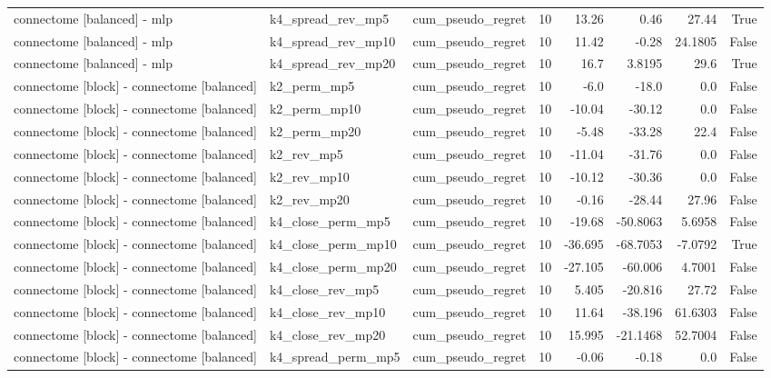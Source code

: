 \begin{table}[t]
\begin{tabular}{lllrrrrr}
connectome [balanced] - mlp & k4\_spread\_rev\_mp5 & cum\_pseudo\_regret & 10 & 13.26 & 0.46 & 27.44 & True \\
connectome [balanced] - mlp & k4\_spread\_rev\_mp10 & cum\_pseudo\_regret & 10 & 11.42 & -0.28 & 24.1805 & False \\
connectome [balanced] - mlp & k4\_spread\_rev\_mp20 & cum\_pseudo\_regret & 10 & 16.7 & 3.8195 & 29.6 & True \\
connectome [block] - connectome [balanced] & k2\_perm\_mp5 & cum\_pseudo\_regret & 10 & -6.0 & -18.0 & 0.0 & False \\
connectome [block] - connectome [balanced] & k2\_perm\_mp10 & cum\_pseudo\_regret & 10 & -10.04 & -30.12 & 0.0 & False \\
connectome [block] - connectome [balanced] & k2\_perm\_mp20 & cum\_pseudo\_regret & 10 & -5.48 & -33.28 & 22.4 & False \\
connectome [block] - connectome [balanced] & k2\_rev\_mp5 & cum\_pseudo\_regret & 10 & -11.04 & -31.76 & 0.0 & False \\
connectome [block] - connectome [balanced] & k2\_rev\_mp10 & cum\_pseudo\_regret & 10 & -10.12 & -30.36 & 0.0 & False \\
connectome [block] - connectome [balanced] & k2\_rev\_mp20 & cum\_pseudo\_regret & 10 & -0.16 & -28.44 & 27.96 & False \\
connectome [block] - connectome [balanced] & k4\_close\_perm\_mp5 & cum\_pseudo\_regret & 10 & -19.68 & -50.8063 & 5.6958 & False \\
connectome [block] - connectome [balanced] & k4\_close\_perm\_mp10 & cum\_pseudo\_regret & 10 & -36.695 & -68.7053 & -7.0792 & True \\
connectome [block] - connectome [balanced] & k4\_close\_perm\_mp20 & cum\_pseudo\_regret & 10 & -27.105 & -60.006 & 4.7001 & False \\
connectome [block] - connectome [balanced] & k4\_close\_rev\_mp5 & cum\_pseudo\_regret & 10 & 5.405 & -20.816 & 27.72 & False \\
connectome [block] - connectome [balanced] & k4\_close\_rev\_mp10 & cum\_pseudo\_regret & 10 & 11.64 & -38.196 & 61.6303 & False \\
connectome [block] - connectome [balanced] & k4\_close\_rev\_mp20 & cum\_pseudo\_regret & 10 & 15.995 & -21.1468 & 52.7004 & False \\
connectome [block] - connectome [balanced] & k4\_spread\_perm\_mp5 & cum\_pseudo\_regret & 10 & -0.06 & -0.18 & 0.0 & False \\

\end{tabular}
\end{table}
